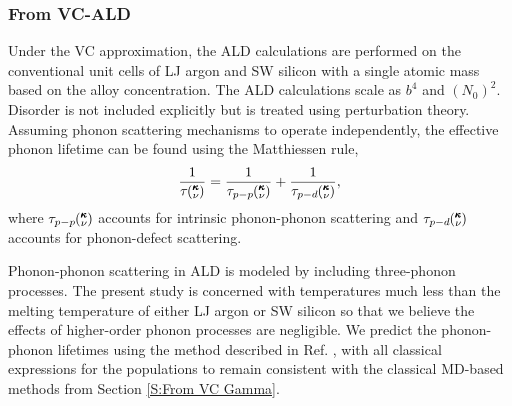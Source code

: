 \documentclass[12pt,twocolumn,iop]{/usr/share/texmf-texlive/tex/latex/iop/iopart}[/usr/share/texmf-texlive/tex/latex/iop/]
\newcommand{\kv}{\mspace{-4.0mu}\left(\mspace{-8.0mu}
\begin{smallmatrix}&\pmb{\kappa} \\&\nu\end{smallmatrix}
\mspace{-3.0mu}\right)}
\begin{document}
\clearpage

\subsubsection{\label{S:From VC-ALD}From VC-ALD}

Under the VC approximation, the 
ALD calculations\cite{turney_predicting_2009-1} are performed on the 
conventional unit cells of LJ argon and SW silicon with a single  
atomic mass based on the alloy concentration. The ALD calculations scale 
as $b^4$ and $(N_{0})^2$.\cite{turney_predicting_2009} Disorder is not included 
explicitly but is treated using perturbation theory. 
Assuming phonon scattering mechanisms 
to operate independently, the 
effective phonon lifetime can be found using the Matthiessen rule,
\cite{ziman_electrons_2001} 
\begin{equation}\label{EQ:Matthiessen}
\frac{1}{\tau\kv} = \frac{1}{\tau_{p-p}\kv} + \frac{1}{\tau_{p-d}\kv},
\end{equation}
where $\tau_{p-p}\kv$ accounts for intrinsic phonon-phonon scattering 
and $\tau_{p-d}\kv$ accounts for phonon-defect scattering.

Phonon-phonon scattering in ALD is modeled by including three-phonon 
processes.\cite{turney_predicting_2009-1,garg_role_2011,tian_phonon_2012} 
The present study is concerned with temperatures much less than the 
melting temperature of either LJ argon
\cite{mcgaughey_phonon_2004} or 
SW silicon\cite{stillinger_computer_1985} so that we believe the effects 
of higher-order phonon processes are 
negligible.\cite{ecsedy_thermal_1977,turney_predicting_2009-1} 
We predict the phonon-phonon lifetimes using the method 
described in Ref. , 
with all classical expressions for the populations to remain 
consistent with the classical MD-based methods from 
Section \ref{S:From VC Gamma}. 
\end{document}
